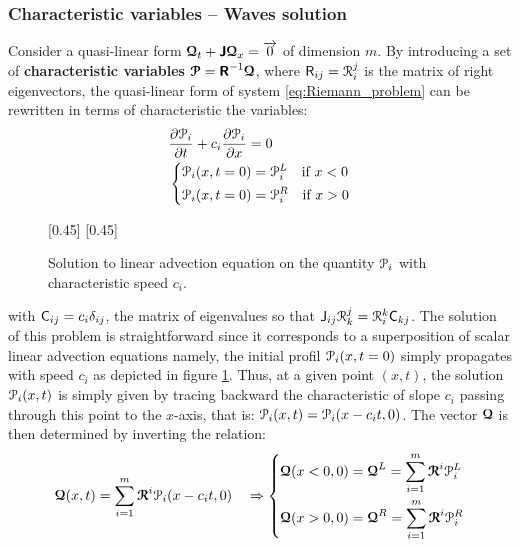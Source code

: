 \subsubsection*{Characteristic variables -- Waves solution}
Consider a quasi-linear form ${\boldsymbol{\mathcal{Q}}}_t + \boldsymbol{\mathsf{J}} {\boldsymbol{\mathcal{Q}}}_x={\overrightarrow{0}}$ of dimension $m$. 
By introducing a set of \textbf{characteristic variables} ${\boldsymbol{\mathcal{P}}}=\boldsymbol{\mathsf{R}}^{-1}{\boldsymbol{\mathcal{Q}}}$, where $\mathsf{R}_{ij}=\mathcal{R}^j_i$ is the matrix of right eigenvectors, the quasi-linear form of system \eqref{eq:Riemann_problem} can be rewritten in terms of characteristic the variables:
\begin{equation*}
  \begin{aligned}
    &\frac{\partial \mathcal{P}_i}{\partial t} + c_i\frac{\partial \mathcal{P}_i}{\partial x} = 0 \\
    &\left\lbrace 
      \begin{aligned}
        & \mathcal{P}_i(x,t=0) = \mathcal{P}_i^L \quad \text{if } x< 0\\
        & \mathcal{P}_i(x,t=0) = \mathcal{P}_i^R \quad \text{if } x> 0
      \end{aligned}
    \right.
  \end{aligned}
\end{equation*}
\begin{figure}[h]
  \centering
  \subcaptionbox*{}[0.45\linewidth]{}
  \subcaptionbox*{}[0.45\linewidth]{}
  \caption{Solution to linear advection equation on the quantity $\mathcal{P}_i$ with characteristic speed $c_i$.}
  \label{fig:advection}
\end{figure}
with $\mathsf{C}_{ij}=c_i\delta_{ij}$, the matrix of eigenvalues so that $\mathsf{J}_{ij} \mathcal{R}^j_k = \mathcal{R}^k_i\mathsf{C}_{kj}$. The solution of this problem is straightforward since it corresponds to a superposition of scalar linear advection equations namely, the initial profil $\mathcal{P}_i(x,t=0)$ simply propagates with speed $c_i$ as depicted in figure \ref{fig:advection}. Thus, at a given point $(x,t)$, the solution $\mathcal{P}_i(x,t)$ is simply given by tracing backward the characteristic of slope $c_i$ passing through this point to the $x$-axis, that is: $\mathcal{P}_i(x,t)=\mathcal{P}_i(x-c_it,0)$. 
The vector ${\boldsymbol{\mathcal{Q}}}$ is then determined by inverting the relation:
\begin{equation}
  \label{eq:Q_expansion}
  {\boldsymbol{\mathcal{Q}}}(x,t) = \sum_{i=1}^m {\boldsymbol{\mathcal{R}}}^i \mathcal{P}_i(x-c_it,0) \quad \Rightarrow
  \left\lbrace
    \begin{aligned}
      & {\boldsymbol{\mathcal{Q}}}(x<0,0)={\boldsymbol{\mathcal{Q}}}^L=\sum_{i=1}^{m}{\boldsymbol{\mathcal{R}}}^i \mathcal{P}_i^L\\
      & {\boldsymbol{\mathcal{Q}}}(x>0,0)={\boldsymbol{\mathcal{Q}}}^R= \sum_{i=1}^{m}{\boldsymbol{\mathcal{R}}}^i \mathcal{P}_i^R
    \end{aligned}
    \right.
\end{equation}
